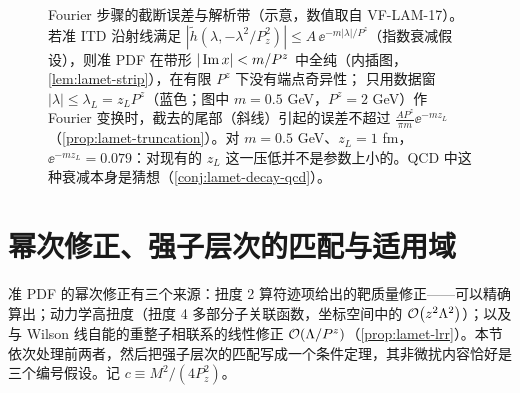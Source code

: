 \begin{figure}[htbp]
\caption{Fourier 步骤的截断误差与解析带（示意，数值取自 VF-LAM-17）。若准 ITD 沿射线满足 $|\tilde h(\lambda,-\lambda^2/P_z^2)|\le A\,\ee^{-m|\lambda|/P^z}$（指数衰减假设），则准 PDF 在带形 $|\operatorname{Im} x|<m/P^z$ 中全纯（内插图，\cref{lem:lamet-strip}），在有限 $P^z$ 下没有端点奇异性；
只用数据窗 $|\lambda|\le\lambda_L=z_LP^z$（蓝色；图中 $m=0.5$ GeV，$P^z=2$ GeV）作 Fourier 变换时，截去的尾部（斜线）引起的误差不超过 $\frac{AP^z}{\pi m}\ee^{-mz_L}$（\cref{prop:lamet-truncation}）。对 $m=0.5$ GeV、$z_L=1$ fm，$\ee^{-mz_L}=0.079$：对现有的 $z_L$ 这一压低并不是参数上小的。QCD 中这种衰减本身是猜想（\cref{conj:lamet-decay-qcd}）。}
\label{fig:lamet-fourier}
\end{figure}

\section{幂次修正、强子层次的匹配与适用域}\label{sec:lamet-power}

准 PDF 的幂次修正有三个来源：扭度 2 算符迹项给出的靶质量修正——可以精确算出；动力学高扭度（扭度 4 多部分子关联函数，坐标空间中的 $\mathcal{O}\!\left(z^2\Lambda^2\right)$）；以及与 Wilson 线自能的重整子相联系的线性修正 $\mathcal{O}\!\left(\Lambda/P^z\right)$（\cref{prop:lamet-lrr}）。本节依次处理前两者，然后把强子层次的匹配写成一个条件定理，其非微扰内容恰好是三个编号假设。记 $c\equiv M^2/(4P_z^2)$。

